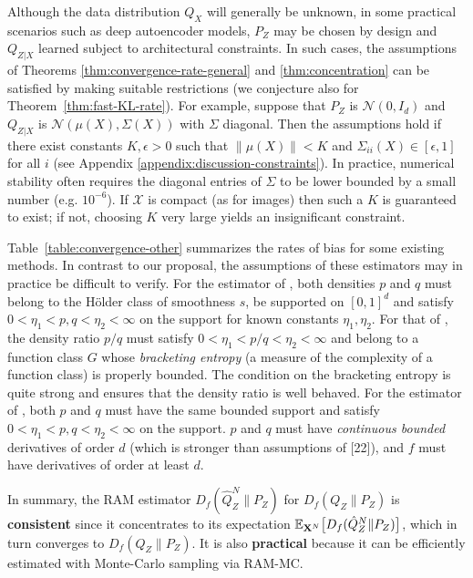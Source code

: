 Although the data distribution $Q_X$ will generally be unknown, in some practical scenarios such as deep autoencoder models, $P_Z$ may be chosen by design and $Q_{Z|X}$ learned subject to architectural constraints.
In such cases, the assumptions of Theorems \ref{thm:convergence-rate-general} and \ref{thm:concentration} can be satisfied by making suitable restrictions (we conjecture also for Theorem~\ref{thm:fast-KL-rate}).
For example, suppose that ${P_Z}$ is  ${\mathcal{N}\left(0, I_d\right)}$ and ${Q_{Z|X}}$ is  ${\mathcal{N}\left( \mu(X), \Sigma(X)\right)}$ with $\Sigma$ diagonal. 
Then the assumptions hold if there exist constants $K, \epsilon > 0$ such that ${\| \mu(X)\| < K}$ and ${\Sigma_{ii}(X) \in [\epsilon, 1]}$ for all $i$ (see Appendix \ref{appendix:discussion-constraints}).
In practice, numerical stability often requires the diagonal entries of $\Sigma$ to be lower bounded by a small number (e.g. $10^{-6}$).
If $\mathcal{X}$ is compact (as for images) then such a $K$ is guaranteed to exist; if not, choosing $K$ very large yields an insignificant constraint.

Table~\ref{table:convergence-other} summarizes the rates of bias for some existing methods.
In contrast to our proposal, the assumptions of these estimators may in practice be difficult to verify.
For the estimator of \cite{krishnamurthy14icml}, both densities $p$ and $q$ must belong to the H\"older class of smoothness $s$, be supported on $[0,1]^d$ and satisfy $0<\eta_1 < p, q < \eta_2<\infty$ on the support for known constants $\eta_1, \eta_2$.
For that of \cite{nguyen10ratio}, the density ratio $p/q$ must satisfy $0<\eta_1 < p/q < \eta_2<\infty$ and belong to a function class $G$ whose \emph{bracketing entropy} (a measure of the complexity of a function class) is properly bounded. The condition on the bracketing entropy is quite strong and ensures that the density ratio is well behaved.
For the estimator of \cite{moon14ensemble}, both $p$ and $q$ must have the same bounded support and satisfy $0<\eta_1 < p, q < \eta_2<\infty$ on the support. $p$ and $q$ must have \emph{continuous bounded} derivatives of order $d$ (which is stronger than assumptions of [22]), and $f$ must have derivatives of order at least $d$.

In summary, the RAM estimator $D_f(\hat{Q}_Z^N \| P_Z)$ for $D_f(Q_Z \| P_Z)$ is \textbf{consistent} since it concentrates to its expectation $\mathbb{E}_{\mathbf{X}^N}\bigl[D_f(\hat{Q}_Z^N \| P_Z)\bigr]$, which in turn converges to $D_f(Q_Z \| P_Z)$.
It is also \textbf{practical} because it can be efficiently estimated with Monte-Carlo sampling via RAM-MC.

